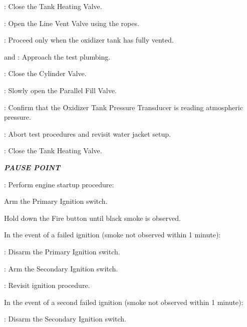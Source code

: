 \begin{checklist}
\begin{checklist}[label=$\bullet$]
        \begin{checklist}
            \item \heat: Close the Tank Heating Valve.
            \item \primary{}: Open the Line Vent Valve using the ropes.
            \item \secondary: Proceed only when the oxidizer tank has fully vented.
            \item \primary{} and \secondary: Approach the test plumbing.
            \item \primary{}: Close the Cylinder Valve.
            \item \primary{}: Slowly open the Parallel Fill Valve.
            \item \daq{}: Confirm that the Oxidizer Tank Pressure Transducer is reading atmospheric pressure.
            \item \ops{}: Abort test procedures and revisit water jacket setup.
        \end{checklist}
    \end{checklist}
    \item \heat: Close the Tank Heating Valve.
    \item \textbf{\textit{PAUSE POINT}}
    \item \primary{}: Perform engine startup procedure:
    \begin{checklist}
        \item Arm the Primary Ignition switch.
        \item Hold down the Fire button until black smoke is observed.
        \begin{checklist}[label=$\bullet$]
            \item In the event of a failed ignition (smoke not observed within 1 minute):
            \begin{checklist}
                \item \primary: Disarm the Primary Ignition switch.
                \item \primary: Arm the Secondary Ignition switch.
                \item \ops: Revisit ignition procedure.
            \end{checklist}
            \item In the event of a second failed ignition (smoke not observed within 1 minute):
            \begin{checklist}
                \item \primary: Disarm the Secondary Ignition switch.

\end{checklist}
\end{checklist}
\end{checklist}
\end{checklist}

